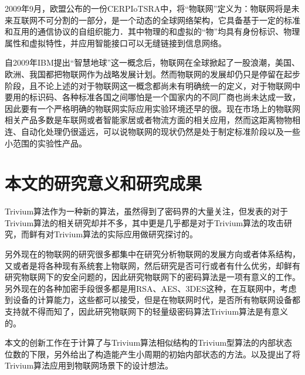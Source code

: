 2009年9月，欧盟公布的一份CERPIoTSRA中，将“物联网”定义为：物联网将是未来互联网不可分割的一部分，是一个动态的全球网络架构，它具备基于一定的标准和互用的通信协议的自组织能力．其中物理的和虚拟的“物”均具有身份标识、物理属性和虚拟特性，并应用智能接口可以无缝链接到信息网络\parencite{宁焕生2010全球物联网发展及中国物联网建设若干思考}。

自2009年IBM提出“智慧地球”这一概念后，物联网在全球掀起了一股浪潮，美国、欧洲、我国都把物联网作为战略发展计划。然而物联网的发展却仍只是停留在起步阶段，且不论上述的对于物联网这一概念都尚未有明确统一的定义，对于物联网中要用的标识码、各种标准各国之间哪怕是一个国家内的不同厂商也尚未达成一致，因此要有一个严格明确的物联网实际应用实验环境还早的很。现在市场上的物联网相关产品多数是车联网或者智能家居或者物流方面的相关应用，然而这距离物物相连、自动化处理仍很遥远，可以说物联网的现状仍然是处于制定标准阶段以及一些小范围的实验性产品。

\section{本文的研究意义和研究成果}

Trivium算法作为一种新的算法，虽然得到了密码界的大量关注，但发表的对于Trivium算法的相关研究却并不多，其中更是几乎都是对于Trivium算法的攻击研究，而鲜有对Trivium算法的实际应用做研究探讨的。

另外现在的物联网的研究很多都集中在研究分析物联网的发展方向或者体系结构，又或者是将各种现有系统套上物联网，然后研究是否可行或者有什么优劣，却鲜有研究物联网下的安全问题的，因此研究物联网下的密码算法是一项有意义的工作。另外现在的各种加密手段很多都是用RSA、AES、3DES这种，在互联网中，考虑到设备的计算能力，这些都可以接受，但是在物联网时代，是否所有物联网设备都支持就不得而知了，因此研究物联网下的轻量级密码算法Trivium算法是有意义的。

本文的创新工作在于计算了与Trivium算法相似结构的Trivium型算法的内部状态位数的下限，另外给出了构造能产生小周期的初始内部状态的方法。以及提出了将Trivium算法应用到物联网场景下的设计想法。
